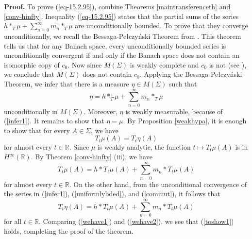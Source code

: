 \documentclass[12pt]{article}
\newcommand{\R}{\mathbb R}
\begin{document}
\noindent
{\bf Proof.}  To prove (\ref{eq-15.2.95}), 
combine Theorems \ref{maintransferenceth} and \ref{conv-hinfty}.
Inequality (\ref{eq-15.2.95}) states that the partial sums of the series 
$h*_T \mu+\sum_{n=0}^\infty m_n*_T \mu$
are unconditionally bounded.  
To prove that they converge unconditionally, we recall
the Bessaga-Pe\l czy\'nski Theorem from \cite{bp}.  This theorem
tells us that for any Banach
space, every unconditionally bounded series is 
unconditionally convergent if and
only if the Banach space does not contain an isomorphic copy of $c_0$.
Now since
$M(\Sigma)$ is weakly complete and $c_0$ is not 
(see \cite[Chap IV.9, Theorem 3, and IV.13.9]{dunford}), we conclude that
 $M(\Sigma)$ does not contain $c_0$.
Applying the Bessaga-Pe\l czy\'nski Theorem, we infer that there is a measure $\eta\in M(\Sigma)$
such that 
\begin{equation}
\eta=h*_T\mu+\sum_{n=0}^\infty m_n*_T \mu
\label{infer1}
\end{equation}
unconditionally in $M(\Sigma)$.  Moreover, $\eta$ is weakly measurable,
because of (\ref{infer1}).
It remains to show that $\eta=\mu$.
By Proposition \ref{weakhypa},
it is enough to show that
for every $A\in \Sigma$, we have
\begin{equation}
T_t\mu(A)=T_t\eta(A)
\label{toshow1}
\end{equation}
for almost every $t\in \R$.  
Since $\mu$ is weakly analytic, the function $t\mapsto T_t\mu(A)$
is in $H^\infty (\R)$.
By Theorem \ref{conv-hinfty} (iii),
we have
\begin{equation}
T_t\mu(A)=h*T_t\mu(A)+\sum_{n=0}^\infty m_n* T_t \mu(A)
\label{wehave1}
\end{equation}
for almost every $t\in \R$.  On the other hand, from
the unconditional convergence of the series in 
(\ref{infer1}), (\ref{uniformlybded}), and (\ref{commut}), it 
follows that
\begin{equation}
T_t\eta(A)=h*T_t\mu(A)+\sum_{n=0}^\infty m_n* T_t \mu(A)
\label{wehave2}
\end{equation}
for all $t\in \R$.  Comparing (\ref{wehave1}) and 
(\ref{wehave2}), we see that (\ref{toshow1})
holds, completing the proof of the theorem.
\end{document}
